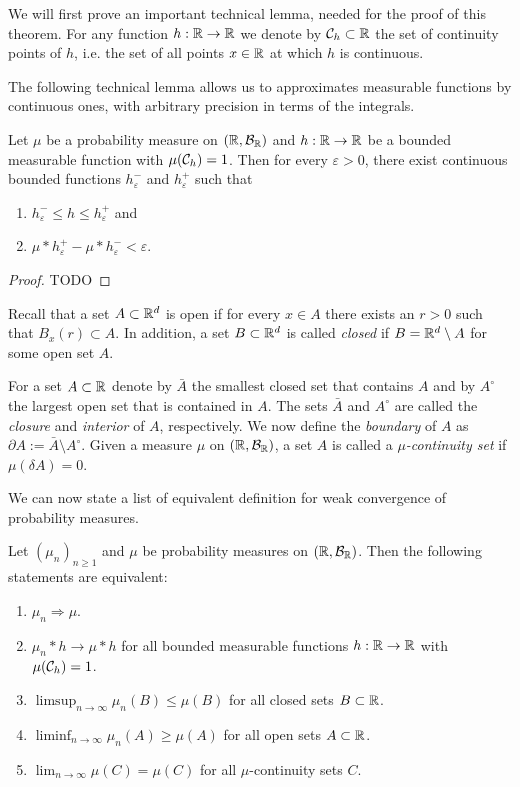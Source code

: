 We will first prove an important technical lemma, needed for the proof of this theorem. For any function $h : \mathbb R \to \mathbb R$ we denote by $\mathcal C_h \subset \mathbb R$ the set of continuity points of $h$, i.e. the set of all points $x\in \mathbb R$ at which $h$ is continuous. 

The following technical lemma allows us to approximates measurable functions by continuous ones, with arbitrary precision in terms of the integrals.

\begin{lemma}
Let $\mu$ be a probability measure on $(\mathbb R, \mathcal B_{\mathbb R})$ and $h : \mathbb R \to \mathbb R$ be a bounded measurable function with $\mu(\mathcal C_h) = 1$. Then for every $\varepsilon > 0$, there exist continuous bounded functions $h^-_\varepsilon$ and $h^+_\varepsilon$ such that
\begin{enumerate}
\item $h^-_\varepsilon \le h \le h^+_\varepsilon$ and
\item $\mu \ast h^+_\varepsilon - \mu \ast h^-_\varepsilon < \varepsilon$.
\end{enumerate} 
\end{lemma}

\begin{proof}
TODO
\end{proof}

Recall that a set $A \subset \mathbb R^d$ is open if for every $x \in A$ there exists an $r > 0$ such that $B_x(r) \subset A$. In addition, a set $B\subset \mathbb R^d$ is called \emph{closed} if $B = \mathbb R^d \setminus A$ for some open set $A$.

For a set $A \subset \mathbb R$ denote by $\bar{A}$ the smallest closed set that contains $A$ and by $A^\circ$ the largest open set that is contained in $A$. The sets $\bar{A}$ and $A^\circ$ are called the \emph{closure} and \emph{interior} of $A$, respectively. We now define the \emph{boundary} of $A$ as $\partial A := \bar{A} \setminus A^\circ$. Given a measure $\mu$ on $(\mathbb R, \mathcal B_{\mathbb R})$, a set $A$ is called a \emph{$\mu$-continuity set} if $\mu(\delta A) = 0$.

\pagebreak

We can now state a list of equivalent definition for weak convergence of probability measures.

\begin{theorem}\label{thm:portmanteau}
Let $(\mu_n)_{n \ge 1}$ and $\mu$ be probability measures on $(\mathbb R, \mathcal B_{\mathbb R})$. Then the following statements are equivalent:
\begin{enumerate}
\item $\mu_n \Rightarrow \mu$.
\item $\mu_n \ast h \to \mu \ast h$ for all bounded measurable functions $h: \mathbb R \to \mathbb R$ with $\mu(\mathcal C_h) = 1$.
\item $\limsup_{n \to \infty} \mu_n(B) \le \mu(B)$ for all closed sets $B \subset \mathbb R$.
\item $\liminf_{n \to \infty} \mu_n(A) \ge \mu(A)$ for all open sets $A \subset \mathbb R$.
\item $\lim_{n \to \infty} \mu(C) = \mu(C)$ for all $\mu$-continuity sets $C$.
\end{enumerate}
\end{theorem} 

